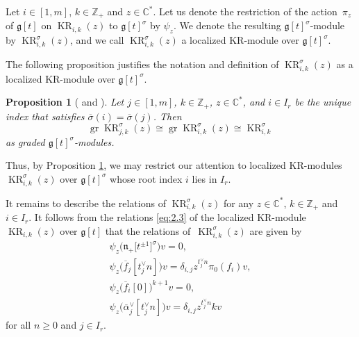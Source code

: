 \documentclass[10pt,a4paper]{amsart}
\numberwithin{equation}{section}
\newtheorem{Proposition}[Theorem]{Proposition}
 { \theoremstyle{definition}
\newtheorem{Definition}[Theorem]{Definition}
\newtheorem{Note}[Theorem]{Note}
\newtheorem{Example}[Theorem]{Example}
\newtheorem{Remark}[Theorem]{Remark} }
\DeclareMathOperator{\gr}{gr}
\DeclareMathOperator{\KR}{KR}
\begin{document}
\begin{Definition}\label{2.4}
Let $i\in [1,m]$, $k\in\mathbb{Z}_+$ and $z\in\mathbb{C}^*$. Let us denote the restriction of the action~$\pi_z$ of $\mathfrak{g}[t]$ on $\KR_{i,k}(z)$ to $\mathfrak{g}[t]^{\sigma}$ by $\psi_z$. We denote the resulting $\mathfrak{g}[t]^{\sigma}$-module by $\KR_{i,k}^{\sigma}(z)$, and we call $\KR_{i,k}^{\sigma}(z)$ a localized KR-module over $\mathfrak{g}[t]^{\sigma}$.
\end{Definition}

The following proposition justifies the notation and definition of $\KR_{i,k}^{\sigma}(z)$ as a localized KR-module over $\mathfrak{g}[t]^{\sigma}$.

\begin{Proposition}[{\cite[Theorem 4]{FL07} and \cite[Propositions 6.6, 6.7 and 7.2]{KV16}}]\label{2.5}
Let $j\in [1,m]$, $k\in\mathbb{Z}_+$, $z\in\mathbb{C}^*$, and $i\in I_r$ be the unique index that satisfies $\overline{\sigma}(i)=\overline{\sigma}(j)$. Then
\begin{equation*}
\gr\KR_{j,k}^{\sigma}(z)\cong \gr\KR_{i,k}^{\sigma}(z)\cong \KR_{i,k}^{\sigma}
\end{equation*}
as graded $\mathfrak{g}[t]^{\sigma}$-modules.
\end{Proposition}

Thus, by Proposition \ref{2.5}, we may restrict our attention to localized KR-modules $\KR_{i,k}^{\sigma}(z)$ over $\mathfrak{g}[t]^{\sigma}$ whose root index $i$ lies in $I_r$.

It remains to describe the relations of $\KR_{i,k}^{\sigma}(z)$ for any $z\in\mathbb{C}^*$, $k\in\mathbb{Z}_+$ and $i\in I_r$. It follows from the relations \eqref{eq:2.3} of the localized KR-module $\KR_{i,k}(z)$ over $\mathfrak{g}[t]$ that the relations of~$\KR_{i,k}^{\sigma}(z)$ are given by{\samepage
\begin{subequations}\label{eq:2.5}
\begin{gather}
\psi_z\bigl(\mathfrak{n}_+\bigl[t^{\pm1}\bigr]^{\sigma}\bigr)v =0,\\
\psi_z\bigl(\overline{f}_j[t_j^{\vee}n]\bigr)v =\delta_{i,j}z^{t_j^{\vee}n}\pi_0(f_i)v,\label{eq:2.5b}\\
\psi_z\bigl(\overline{f}_i[0]\bigr)^{k+1}v =0, \label{eq:2.5c}\\
\psi_z\bigl(\overline{\alpha}_j^{\vee}[t_j^{\vee}n]\bigr)v =\delta_{i,j}z^{t_j^{\vee}n}kv
\end{gather}
\end{subequations}
for all $n\geq0$ and $j\in I_r$.}
\end{document}
